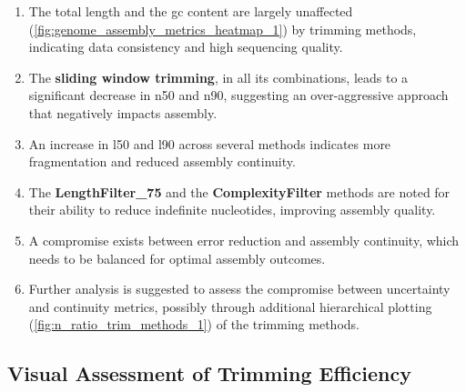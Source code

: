 \begin{enumerate}
  \item The \gls{total length} and the \gls{gc} content are largely unaffected (\autoref{fig:genome_assembly_metrics_heatmap_1}) by \gls{trimming} methods, indicating data consistency and high \gls{sequencing} quality.
  \item The \textbf{sliding window \gls{trimming}}, in all its combinations, leads to a significant decrease in \gls{n50} and \gls{n90}, suggesting an over-aggressive approach that negatively impacts \gls{assembly}.
  \item An increase in \gls{l50} and \gls{l90} across several methods indicates more fragmentation and reduced \gls{assembly} continuity.
  \item The \textbf{LengthFilter\_75} and the \textbf{ComplexityFilter} methods are noted for their ability to reduce indefinite nucleotides, improving \gls{assembly} quality.
  \item A compromise exists between error reduction and \gls{assembly} continuity, which needs to be balanced for optimal \gls{assembly} outcomes.
  \item Further analysis is suggested to assess the compromise between uncertainty and continuity \gls{metrics}, possibly through additional hierarchical plotting (\autoref{fig:n_ratio_trim_methods_1}) of the \gls{trimming} methods.
\end{enumerate}

\subsection{Visual Assessment of Trimming Efficiency} 

